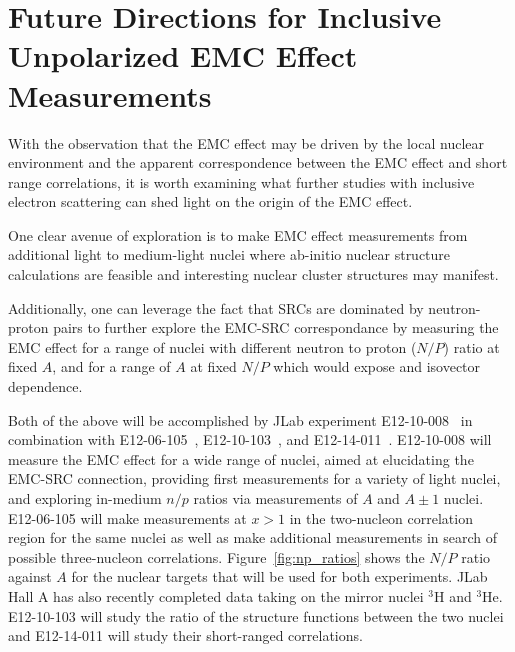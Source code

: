 \section{Future Directions for Inclusive Unpolarized EMC Effect Measurements}

With the observation that the EMC effect may be driven by the local nuclear environment
and the apparent correspondence between the EMC effect and short range correlations, it is worth examining what
further studies with inclusive electron scattering can shed light on the origin of the EMC effect.

One clear avenue of exploration is to make EMC effect measurements from additional light to medium-light
nuclei where ab-initio nuclear structure calculations are feasible and interesting nuclear cluster
structures may manifest.

Additionally, one can leverage the fact that SRCs are dominated by neutron-proton pairs to further explore
the EMC-SRC correspondance by measuring the EMC effect for a range of nuclei with
different neutron to proton ($N/P$) ratio at fixed $A$, and for a range of $A$ at fixed $N/P$ which would
expose and isovector dependence.

Both of the above will be accomplished by JLab experiment E12-10-008~\cite{12gev_emc} in combination
with E12-06-105~\cite{12gev_xgt1}, E12-10-103~\cite{mar}, and E12-14-011~\cite{tritsrc}. E12-10-008 will measure the EMC effect for a wide range of nuclei,
aimed at elucidating the EMC-SRC connection, providing first measurements for a variety of light nuclei,
and exploring in-medium $n/p$ ratios via measurements of $A$ and $A\pm1$ nuclei.  E12-06-105 will make
measurements at $x>1$ in the two-nucleon correlation region for the same nuclei as well as make additional
measurements in search of possible three-nucleon correlations. Figure~\ref{fig:np_ratios} shows the $N/P$
ratio against $A$ for the nuclear targets that will be used for both experiments.%
JLab Hall A has also recently completed data taking on the mirror nuclei $^3$H and $^3$He. 
E12-10-103 will study the ratio of the structure functions between the two nuclei and 
E12-14-011 will study their short-ranged correlations.

